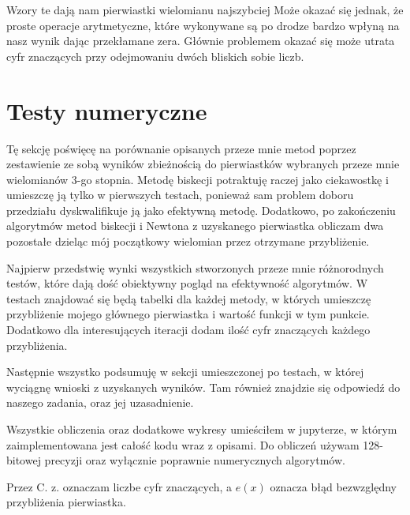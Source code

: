 \documentclass[a4paper]{article}
\begin{document}
    Wzory te dają nam pierwiastki wielomianu najszybciej Może okazać się jednak, że proste operacje arytmetyczne,
    które wykonywane są po drodze bardzo wpłyną na nasz wynik dając przekłamane zera. Głównie problemem okazać się 
    może utrata cyfr znaczących przy odejmowaniu dwóch bliskich sobie liczb.

\newpage
\section{Testy numeryczne}
    Tę sekcję poświęcę na porównanie opisanych przeze mnie metod poprzez zestawienie ze sobą wyników zbieżnością
    do pierwiastków wybranych przeze mnie wielomianów 3-go stopnia. Metodę biskecji potraktuję raczej jako ciekawostkę
    i umieszczę ją tylko w pierwszych testach, ponieważ sam problem doboru przedziału dyskwalifikuje ją jako 
    efektywną metodę. Dodatkowo, po zakończeniu algorytmów metod biskecji i Newtona z uzyskanego pierwiastka
    obliczam dwa pozostałe dzieląc mój początkowy wielomian przez otrzymane przybliżenie.

    Najpierw przedstwię wynki wszystkich stworzonych przeze mnie różnorodnych testów, które dają dość obiektywny 
    pogląd na efektywność algorytmów. W testach znajdować się będą tabelki dla każdej metody, w których umieszczę przybliżenie
    mojego głównego pierwiastka i wartość funkcji w tym punkcie. Dodatkowo dla interesujących iteracji dodam ilość cyfr znaczących
    każdego przybliżenia.

    Następnie wszystko podsumuję w sekcji umieszczonej po testach, w której wyciągnę wnioski z uzyskanych wyników. 
    Tam również znajdzie się odpowiedź do naszego zadania, oraz jej uzasadnienie.

    \vspace{5mm}

    Wszystkie obliczenia oraz dodatkowe wykresy umieściłem w jupyterze, w którym zaimplementowana jest całość kodu
    wraz z opisami. Do obliczeń używam 128-bitowej precyzji oraz wyłącznie poprawnie numerycznych algorytmów.

    \vspace{5mm}
        
    Przez C. z. oznaczam liczbe cyfr znaczących, a $e(x)$ oznacza błąd bezwzględny przybliżenia pierwiastka.
\end{document}
